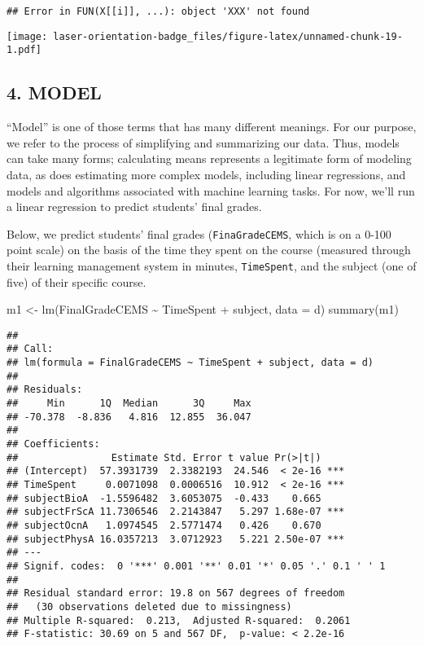 \documentclass[
]{article}
\newenvironment{Shaded}{\begin{snugshade}}{\end{snugshade}}
\newcommand{\AttributeTok}[1]{\textcolor[rgb]{0.77,0.63,0.00}{#1}}
\newcommand{\FunctionTok}[1]{\textcolor[rgb]{0.00,0.00,0.00}{#1}}
\newcommand{\NormalTok}[1]{#1}
\newcommand{\OtherTok}[1]{\textcolor[rgb]{0.56,0.35,0.01}{#1}}
\newcommand{\SpecialCharTok}[1]{\textcolor[rgb]{0.00,0.00,0.00}{#1}}
\begin{document}
\begin{verbatim}
## Error in FUN(X[[i]], ...): object 'XXX' not found
\end{verbatim}

\texttt{[image: laser-orientation-badge\_files/figure-latex/unnamed-chunk-19-1.pdf]}

\hypertarget{model}{%
\subsection{4. MODEL}\label{model}}

``Model'' is one of those terms that has many different meanings. For
our purpose, we refer to the process of simplifying and summarizing our
data. Thus, models can take many forms; calculating means represents a
legitimate form of modeling data, as does estimating more complex
models, including linear regressions, and models and algorithms
associated with machine learning tasks. For now, we'll run a linear
regression to predict students' final grades.

Below, we predict students' final grades (\texttt{FinaGradeCEMS}, which
is on a 0-100 point scale) on the basis of the time they spent on the
course (measured through their learning management system in minutes,
\texttt{TimeSpent}, and the subject (one of five) of their specific
course.

\begin{Shaded}
\begin{Highlighting}[]
\NormalTok{m1 }\OtherTok{\textless{}{-}} \FunctionTok{lm}\NormalTok{(FinalGradeCEMS }\SpecialCharTok{\textasciitilde{}}\NormalTok{ TimeSpent }\SpecialCharTok{+}\NormalTok{ subject, }\AttributeTok{data =}\NormalTok{ d)}
\FunctionTok{summary}\NormalTok{(m1)}
\end{Highlighting}
\end{Shaded}

\begin{verbatim}
## 
## Call:
## lm(formula = FinalGradeCEMS ~ TimeSpent + subject, data = d)
## 
## Residuals:
##     Min      1Q  Median      3Q     Max 
## -70.378  -8.836   4.816  12.855  36.047 
## 
## Coefficients:
##                Estimate Std. Error t value Pr(>|t|)    
## (Intercept)  57.3931739  2.3382193  24.546  < 2e-16 ***
## TimeSpent     0.0071098  0.0006516  10.912  < 2e-16 ***
## subjectBioA  -1.5596482  3.6053075  -0.433    0.665    
## subjectFrScA 11.7306546  2.2143847   5.297 1.68e-07 ***
## subjectOcnA   1.0974545  2.5771474   0.426    0.670    
## subjectPhysA 16.0357213  3.0712923   5.221 2.50e-07 ***
## ---
## Signif. codes:  0 '***' 0.001 '**' 0.01 '*' 0.05 '.' 0.1 ' ' 1
## 
## Residual standard error: 19.8 on 567 degrees of freedom
##   (30 observations deleted due to missingness)
## Multiple R-squared:  0.213,  Adjusted R-squared:  0.2061 
## F-statistic: 30.69 on 5 and 567 DF,  p-value: < 2.2e-16
\end{verbatim}
\end{document}
